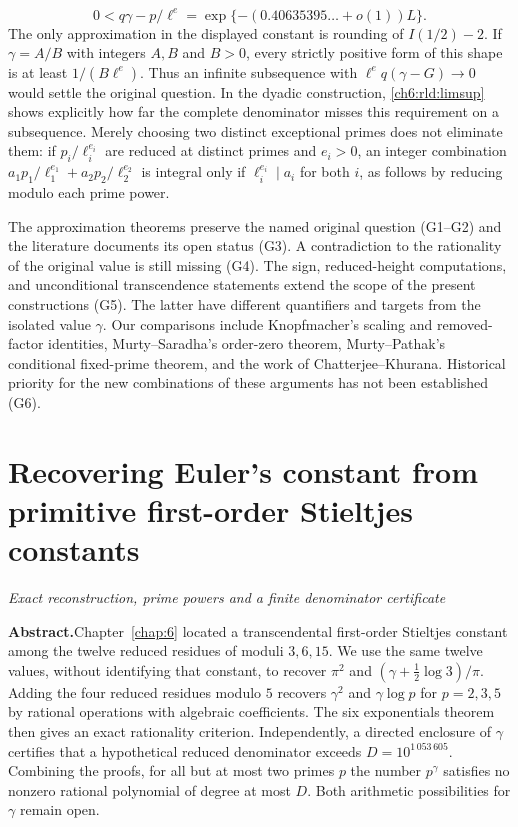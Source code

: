 \documentclass[11pt,a4paper,oneside,openany]{report}
\theoremstyle{remark}\newtheorem{remark}[theorem]{Remark}
\numberwithin{equation}{section}
\begin{document}
\[
 0<q\gamma-p/\ell^e=\exp\{-(0.40635395\ldots+o(1))L\}.
\]
The only approximation in the displayed constant is rounding of $I(1/2)-2$. If $\gamma=A/B$ with integers $A,B$ and $B>0$, every strictly positive form of this shape is at least $1/(B\ell^e)$. Thus an infinite subsequence with $\ell^e q(\gamma-G)\to0$ would settle the original question. In the dyadic construction, \eqref{ch6:rld:limsup} shows explicitly how far the complete denominator misses this requirement on a subsequence. Merely choosing two distinct exceptional primes does not eliminate them: if $p_i/\ell_i^{e_i}$ are reduced at distinct primes and $e_i>0$, an integer combination $a_1p_1/\ell_1^{e_1}+a_2p_2/\ell_2^{e_2}$ is integral only if $\ell_i^{e_i}\mid a_i$ for both $i$, as follows by reducing modulo each prime power.

The approximation theorems preserve the named original question (G1--G2) and the literature documents its open status (G3). A contradiction to the rationality of the original value is still missing (G4). The sign, reduced-height computations, and unconditional transcendence statements extend the scope of the present constructions (G5). The latter have different quantifiers and targets from the isolated value $\gamma$. Our comparisons include Knopfmacher's scaling and removed-factor identities, Murty--Saradha's order-zero theorem, Murty--Pathak's conditional fixed-prime theorem, and the work of Chatterjee--Khurana. Historical priority for the new combinations of these arguments has not been established (G6).

\chapter[Recovery from first-order Stieltjes constants]{Recovering Euler's constant from primitive first-order Stieltjes constants}\label{chap:7}
{\noindent\large\itshape Exact reconstruction, prime powers and a finite denominator certificate\par}\vspace{9pt}
\noindent\textbf{Abstract.}\enspace Chapter~\ref{chap:6} located a transcendental first-order Stieltjes constant among the twelve reduced residues of moduli $3,6,15$. We use the same twelve values, without identifying that constant, to recover $\pi^2$ and $(\gamma+\tfrac12\log3)/\pi$. Adding the four reduced residues modulo $5$ recovers $\gamma^2$ and $\gamma\log p$ for $p=2,3,5$ by rational operations with algebraic coefficients. The six exponentials theorem then gives an exact rationality criterion. Independently, a directed enclosure of $\gamma$ certifies that a hypothetical reduced denominator exceeds $D=10^{1\,053\,605}$. Combining the proofs, for all but at most two primes $p$ the number $p^\gamma$ satisfies no nonzero rational polynomial of degree at most $D$. Both arithmetic possibilities for $\gamma$ remain open.
\end{document}
